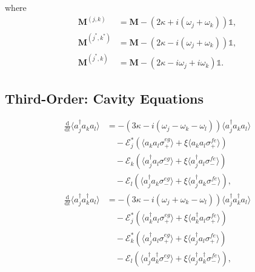 \documentclass{article}
\newcommand{\ddt}{\frac{\mathrm{d}}{\mathrm{d}t}}
\begin{document}
where
\begin{subequations}
\begin{align}
	\bm{M}^{(j, k)} &= \bm{M} - \left( 2 \kappa + i \left( \omega_{j} + \omega_{k} \right) \right) \mathbb{1}, \\
	\bm{M}^{(j^{*}, k^{*})} &= \bm{M} - \left( 2 \kappa - i \left( \omega_{j} + \omega_{k} \right) \right) \mathbb{1}, \\
	\bm{M}^{(j^{*}, k)} &= \bm{M} - \left( 2 \kappa - i \omega_{j} + i \omega_{k} \right) \mathbb{1}.
\end{align}
\end{subequations}

\subsection{Third-Order: Cavity Equations}

\begin{subequations}
\begin{align}
	\ddt \langle a^{\dagger}_{j} a_{k} a_{l} \rangle &= -\left( 3 \kappa - i \left( \omega_{j} - \omega_{k} - \omega_{l} \right) \right) \langle a^{\dagger}_{j} a_{k} a_{l} \rangle \nonumber \\
	&\quad - \mathcal{E}_{j}^{*} \left( \langle a_{k} a_{l} \sigma^{eg}_{+} \rangle + \xi \langle a_{k} a_{l} \sigma^{fe}_{+} \rangle \right) \nonumber \\
	&\quad - \mathcal{E}_{k} \left( \langle a^{\dagger}_{j} a_{l} \sigma^{eg}_{-} \rangle + \xi \langle a^{\dagger}_{j} a_{l} \sigma^{fe}_{-} \rangle \right) \nonumber \\
	&\quad - \mathcal{E}_{l} \left( \langle a^{\dagger}_{j} a_{k} \sigma^{eg}_{-} \rangle + \xi \langle a^{\dagger}_{j} a_{k} \sigma^{fe}_{-} \rangle \right) , \\
	\ddt \langle a^{\dagger}_{j} a^{\dagger}_{k} a_{l} \rangle &= -\left( 3 \kappa - i \left( \omega_{j} + \omega_{k} - \omega_{l} \right) \right) \langle a^{\dagger}_{j} a^{\dagger}_{k} a_{l} \rangle \nonumber \\
	&\quad - \mathcal{E}_{j}^{*} \left( \langle a^{\dagger}_{k} a_{l} \sigma^{eg}_{+} \rangle + \xi \langle a^{\dagger}_{k} a_{l} \sigma^{fe}_{+} \rangle \right) \nonumber \\
	&\quad - \mathcal{E}_{k}^{*} \left( \langle a^{\dagger}_{j} a_{l} \sigma^{eg}_{+} \rangle + \xi \langle a^{\dagger}_{j} a_{l} \sigma^{fe}_{+} \rangle \right) \nonumber \\
	&\quad - \mathcal{E}_{l} \left( \langle a^{\dagger}_{j} a^{\dagger}_{k} \sigma^{eg}_{-} \rangle + \xi \langle a^{\dagger}_{j} a^{\dagger}_{k} \sigma^{fe}_{-} \rangle \right) , 
\end{align}
\end{subequations}
\end{document}
